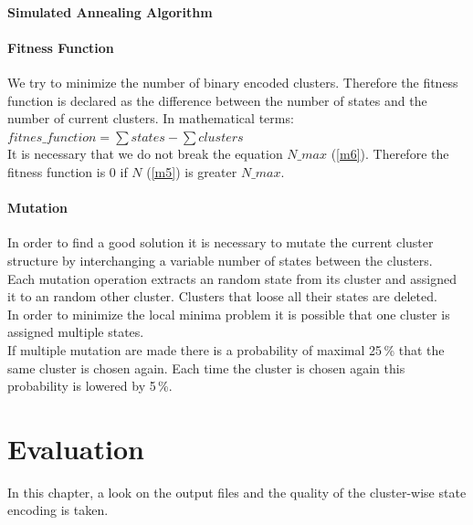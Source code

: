 \subsubsection{Simulated Annealing Algorithm}
\label{subsubsec:SAAlgorithm}



\subsubsection{Fitness Function}
\label{subsubsec:FitnessFunction}

We try to minimize the number of binary encoded clusters. Therefore the fitness function is declared as the difference between the number of states and the number of current clusters. In mathematical terms: 
$ fitnes\_function = \sum{states} - \sum{clusters} $\\
It is necessary that we do not break the equation  $N\_max$ (\ref{m6}). Therefore the fitness function is 0 if $ N $ (\ref{m5}) is greater $N\_max$. 

\subsubsection{Mutation}
\label{subsubsec:Mutation}

In order to find a good solution it is necessary to mutate the current cluster structure by interchanging a variable number of states between the clusters. \\
Each mutation operation extracts an random state from its cluster and assigned it to an random other cluster. Clusters that loose all their states are deleted. \\
In order to minimize the local minima problem it is possible that one cluster is assigned multiple states.\\
If multiple mutation are made there is a probability of maximal 25\,\% that the same cluster is chosen again. Each time the cluster is chosen again this probability is lowered by 5\,\%.


\chapter{Evaluation}
\label{cha:Evaluation}

In this chapter, a look on the output files and the quality of the cluster-wise state encoding is taken.

